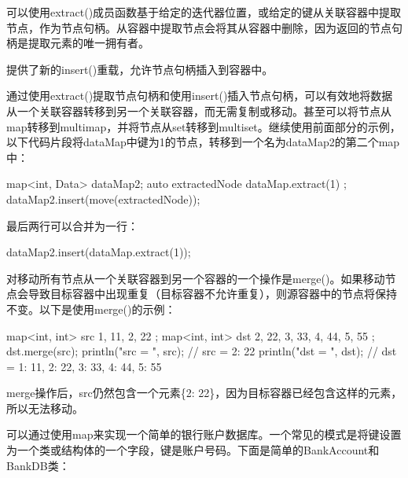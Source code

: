 可以使用extract()成员函数基于给定的迭代器位置，或给定的键从关联容器中提取节点，作为节点句柄。从容器中提取节点会将其从容器中删除，因为返回的节点句柄是提取元素的唯一拥有者。

提供了新的insert()重载，允许节点句柄插入到容器中。

通过使用extract()提取节点句柄和使用insert()插入节点句柄，可以有效地将数据从一个关联容器转移到另一个关联容器，而无需复制或移动。甚至可以将节点从map转移到multimap，并将节点从set转移到multiset。继续使用前面部分的示例，以下代码片段将dataMap中键为1的节点，转移到一个名为dataMap2的第二个map中：

\begin{cpp}
map<int, Data> dataMap2;
auto extractedNode { dataMap.extract(1) };
dataMap2.insert(move(extractedNode));
\end{cpp}

最后两行可以合并为一行：

\begin{cpp}
dataMap2.insert(dataMap.extract(1));
\end{cpp}

对移动所有节点从一个关联容器到另一个容器的一个操作是merge()。如果移动节点会导致目标容器中出现重复（目标容器不允许重复），则源容器中的节点将保持不变。以下是使用merge()的示例：

\begin{cpp}
map<int, int> src { {1, 11}, {2, 22} };
map<int, int> dst { {2, 22}, {3, 33}, {4, 44}, {5, 55} };
dst.merge(src);
println("src = {}", src); // src = {2: 22}
println("dst = {}", dst); // dst = {1: 11, 2: 22, 3: 33, 4: 44, 5: 55}
\end{cpp}

merge操作后，src仍然包含一个元素\{2: 22\}，因为目标容器已经包含这样的元素，所以无法移动。


可以通过使用map来实现一个简单的银行账户数据库。一个常见的模式是将键设置为一个类或结构体的一个字段，键是账户号码。下面是简单的BankAccount和BankDB类：

